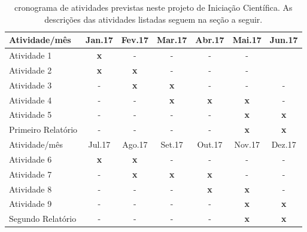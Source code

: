 \documentclass[12pt]{article}
\begin{document}
\begin{table}[!ht]
\caption{cronograma de atividades previstas neste projeto de
    Iniciação Científica. As descrições das atividades listadas seguem
    na seção a seguir.} 
\label{tab:cronograma}
\begin{center}
\smallskip
\begin{tabular}{l ccc ccc}
    \toprule
    \small Atividade/mês & \small Jan.17 & \small Fev.17 & \small Mar.17
                         & \small Abr.17 & \small Mai.17 & \small Jun.17
    \\ \hline

    \small Atividade 1   
    & \small {\bf x} & \small - & \small - & \small - & \small - \\

    \small Atividade 2   
    & \small {\bf x} & \small {\bf x} & \small - & \small - 
    & \small - \\

    \small Atividade 3   
    & \small - & \small {\bf x} & \small {\bf x} & \small - & \small -
    & \small - \\

    \small Atividade 4
    & \small - & \small - & \small {\bf x} & \small {\bf x} 
    & \small {\bf x} &  \small - \\

    \small Atividade 5   
    & \small - & \small - & \small - & \small - & \small {\bf x} 
    & \small {\bf x} \\

    \small Primeiro Relatório  
    & \small - & \small - & \small - & \small - & \small {\bf x} 
    & \small {\bf x} \\
    \bottomrule
    \toprule
    \small Atividade/mês & \small Jul.17 & \small Ago.17 & \small Set.17
                         & \small Out.17 & \small Nov.17 & \small Dez.17
    \\ \hline

    \small Atividade 6   
    & \small {\bf x} & \small {\bf x} & \small - & \small - & \small - 
    & \small - \\

    \small Atividade 7
    & \small - & \small {\bf x} & \small {\bf x} & \small{\bf x} 
    & \small - &  \small -\\

    \small Atividade 8  
    & \small - & \small - & \small - & \small {\bf x} & \small {\bf x} 
    & \small - \\

    \small Atividade 9
    & \small - & \small - & \small - & \small - & \small {\bf x} 
    & \small {\bf x}\\

    \small Segundo Relatório
    & \small - & \small - & \small - & \small - & \small {\bf x} 
    & \small {\bf x}\\
    \bottomrule
\end{tabular}
\end{center}
\end{table}
\end{document}
